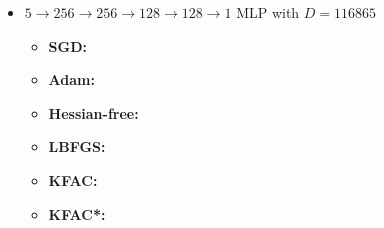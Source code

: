 \begin{itemize}
\item $5 \to 256 \to 256\to 128 \to 128 \to 1$ MLP with $D=\num{116865}$
  \begin{itemize}
    \def\pathToRuns{kfac_pinns_exp/exp19_poisson5d_mlp_tanh_256/tex}
  \item \textbf{SGD:} 
  \item \textbf{Adam:} 
  \item \textbf{Hessian-free:} 
  \item \textbf{LBFGS:} 
  \item \textbf{KFAC:} 
  \item \textbf{KFAC*:} 
  \end{itemize}
\end{itemize}

